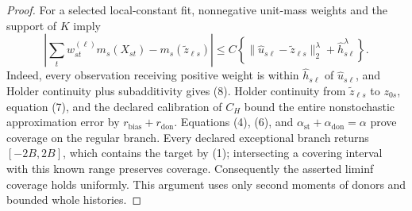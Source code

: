 \documentclass{article}
\begin{document}
\begin{proof}
For a selected local-constant fit, nonnegative unit-mass weights and the support of \(K\) imply
\[
 \left|\sum_tw_{st}^{(\ell)}m_s(X_{st})-
 m_s(\widetilde z_{\ell s})\right|
 \le C\left\{
 \|\widehat u_{s\ell}-\widetilde z_{\ell s}\|_2^\lambda
 +\widehat h_{s\ell}^\lambda\right\}.                    \tag{8}
\]
Indeed, every observation receiving positive weight is within \(\widehat h_{s\ell}\) of \(\widehat u_{s\ell}\), and Holder continuity plus subadditivity gives (8).  Holder continuity from \(\widetilde z_{\ell s}\) to \(z_{0s}\), equation (7), and the declared calibration of \(C_H\) bound the entire nonstochastic approximation error by \(r_{\mathrm{bias}}+r_{\mathrm{don}}\).  Equations (4), (6), and
\(\alpha_{\mathrm{st}}+\alpha_{\mathrm{don}}=\alpha\) prove coverage on the regular branch.  Every declared exceptional branch returns \([-2B,2B]\), which contains the target by (1); intersecting a covering interval with this known range preserves coverage.  Consequently the asserted liminf coverage holds uniformly.  This argument uses only second moments of donors and bounded whole histories.


\end{proof}
\end{document}
